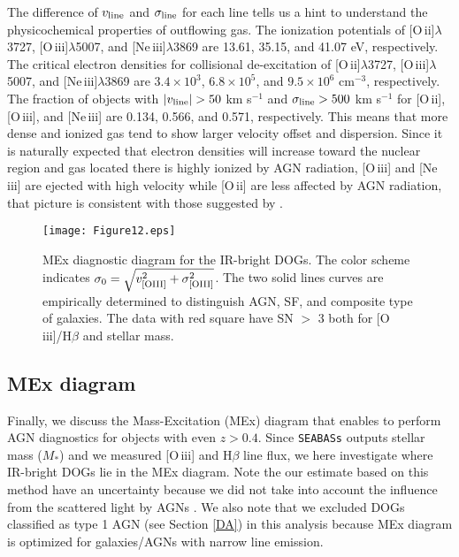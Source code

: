 \documentclass[twocolumn]{aastex6}
\newcommand{\oiii}{[O{\,\sc iii}]\,\,}
\newcommand{\oii}{[O{\,\sc ii}]\,\,}
\newcommand{\neiii}{[Ne{\,\sc iii}]\,\,}
\begin{document}
The difference of $v_{\rm line}$ and $\sigma_{\rm line}$ for each line tells us a hint to understand the physicochemical properties of outflowing gas.
The ionization potentials of [O{\,\sc ii}]$\lambda$3727, [O{\,\sc iii}]$\lambda$5007, and [Ne{\,\sc iii}]$\lambda$3869 are 13.61, 35.15, and 41.07 eV, respectively.
The critical electron densities for collisional de-excitation of [O{\,\sc ii}]$\lambda$3727, [O{\,\sc iii}]$\lambda$5007, and [Ne{\,\sc iii}]$\lambda$3869 are $3.4 \times 10^3$, $6.8 \times 10^5$, and $9.5 \times 10^6$ cm$^{-3}$, respectively.  
The fraction of objects with $|v_{\rm line}| > 50$ km s$^{-1}$ and $\sigma_{\rm line} > 500$ km s$^{-1}$ for [O{\,\sc ii}], [O{\,\sc iii}], and [Ne{\,\sc iii}] are 0.134, 0.566, and 0.571, respectively.
This means that more dense and ionized gas tend to show larger velocity offset and dispersion. 
Since it is naturally expected that electron densities will increase toward the nuclear region and gas located there is highly ionized by AGN radiation, \oiii and \neiii are ejected with high velocity while \oii are less affected by AGN radiation, that picture is consistent with those suggested by \cite{Barrows} \citep[see also][]{Komossa}.


   \begin{figure}
   \centering
   \texttt{[image: Figure12.eps]}
   \caption{MEx diagnostic diagram for the IR-bright DOGs. The color scheme indicates $\sigma_0 = \sqrt{v_{\rm [OIII]}^2 + \sigma_{\rm [OIII]}^2}$. The two solid lines curves are empirically determined to distinguish AGN, SF, and composite type of galaxies. The data with red square have SN $>$ 3 both for [O{\,\sc iii}]/H$\beta$ and stellar mass.}
   \label{MEx}
   \end{figure}   
   
\subsection{MEx diagram}
Finally, we discuss the Mass-Excitation (MEx) diagram \citep{Juneau_11,Juneau_14} that enables to perform AGN diagnostics for objects with even $z > 0.4$.
Since {\tt SEABASs} outputs stellar mass ($M_*$) and we measured \oiii and H$\beta$ line flux, we here investigate where IR-bright DOGs lie in the MEx diagram.
Note the our estimate based on this method have an uncertainty because we did not take into account the influence from the scattered light by AGNs \citep[see also][]{Hamann,Toba_17b}.
We also note that we excluded DOGs classified as type 1 AGN (see Section \ref{DA}) in this analysis because MEx diagram is optimized for galaxies/AGNs with narrow line emission.
\end{document}
